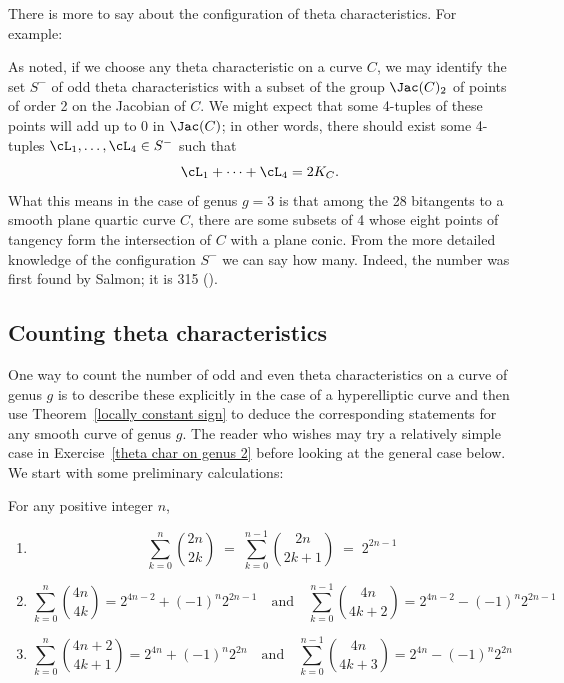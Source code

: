 There is more to say about the configuration of theta characteristics. For example:
\begin{fact}
 As noted, if we choose any theta characteristic on a curve $C$, we may identify the set $S^-$ of odd theta characteristics with a subset of the group $\Jac(C)_2$ of points of order 2 on the Jacobian of $C$. We might expect that some 4-tuples of these points will add up to 0 in $\Jac(C)$; in other words, there should exist some 4-tuples $\cL_1,\dots,\cL_4 \in S^-$ such that
$$
\cL_1+ \dots +\cL_4 = 2K_C.
$$
What this means in the case of genus $g=3$ is that among the 28 bitangents to a smooth plane quartic curve $C$, there are some subsets of 4 whose eight points of tangency form the intersection of $C$ with a plane conic. From the more detailed knowledge of the configuration $S^-$ we can say how many. Indeed, the number was first found by Salmon; it is 315 (\cite{MR0115124}).
\end{fact}

\subsection{Counting theta characteristics}\label{theta characteristic count}

One way to count the number of odd and even theta characteristics on a curve of genus $g$ is  to describe these explicitly in the case of a hyperelliptic curve and then use Theorem~\ref{locally constant sign} to deduce the corresponding statements for any smooth curve of genus $g$. 
The reader who wishes may  try a relatively simple case in Exercise~\ref{theta char on genus 2} before looking at the general case below.
We start with some preliminary calculations:

\begin{lemma}\label{summing binomials}
For any positive integer $n$,
\begin{enumerate}
\item 
$$
\sum_{k=0}^n \binom{2n}{2k} \; = \; \sum_{k=0}^{n-1} \binom{2n}{2k+1} \; = \; 2^{2n-1}
$$
\item 
$$
\sum_{k=0}^n \binom{4n}{4k} = 2^{4n-2}  + (-1)^n 2^{2n-1} \quad \text{and} \quad \sum_{k=0}^{n-1} \binom{4n}{4k+2} = 2^{4n-2} - (-1)^n  2^{2n-1}
$$
\item 
$$
\sum_{k=0}^n \binom{4n+2}{4k+1} = 2^{4n} + (-1)^n 2^{2n} \quad \text{and} \quad \sum_{k=0}^{n-1} \binom{4n}{4k+3} = 2^{4n} - (-1)^n  2^{2n}
$$
\end{enumerate}
\end{lemma}

